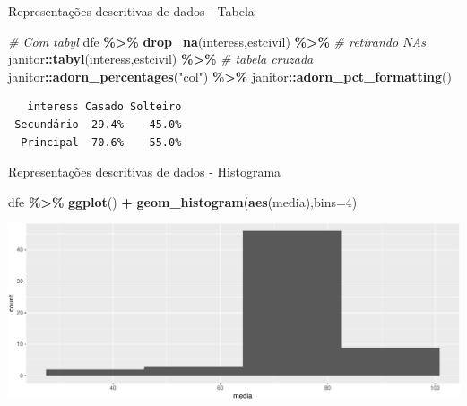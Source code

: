 \documentclass[
  9pt,
  ignorenonframetext,
  aspectratio=169]{beamer}
\newenvironment{Shaded}{\begin{snugshade}}{\end{snugshade}}
\newcommand{\CommentTok}[1]{\textcolor[rgb]{0.56,0.35,0.01}{\textit{#1}}}
\newcommand{\DataTypeTok}[1]{\textcolor[rgb]{0.13,0.29,0.53}{#1}}
\newcommand{\DecValTok}[1]{\textcolor[rgb]{0.00,0.00,0.81}{#1}}
\newcommand{\KeywordTok}[1]{\textcolor[rgb]{0.13,0.29,0.53}{\textbf{#1}}}
\newcommand{\NormalTok}[1]{#1}
\newcommand{\OperatorTok}[1]{\textcolor[rgb]{0.81,0.36,0.00}{\textbf{#1}}}
\newcommand{\StringTok}[1]{\textcolor[rgb]{0.31,0.60,0.02}{#1}}
\begin{document}
\begin{frame}[fragile]{Representações descritivas de dados - Tabela}
\protect\hypertarget{representauxe7uxf5es-descritivas-de-dados---tabela}{}
\begin{Shaded}
\begin{Highlighting}[]
\CommentTok{\# Com tabyl}
\NormalTok{dfe }\OperatorTok{\%\textgreater{}\%}
\StringTok{  }\KeywordTok{drop\_na}\NormalTok{(interess,estcivil) }\OperatorTok{\%\textgreater{}\%}\StringTok{ }\CommentTok{\# retirando NAs}
\StringTok{  }\NormalTok{janitor}\OperatorTok{::}\KeywordTok{tabyl}\NormalTok{(interess,estcivil) }\OperatorTok{\%\textgreater{}\%}\StringTok{ }\CommentTok{\# tabela cruzada}
\StringTok{  }\NormalTok{janitor}\OperatorTok{::}\KeywordTok{adorn\_percentages}\NormalTok{(}\StringTok{"col"}\NormalTok{) }\OperatorTok{\%\textgreater{}\%}
\StringTok{  }\NormalTok{janitor}\OperatorTok{::}\KeywordTok{adorn\_pct\_formatting}\NormalTok{()}
\end{Highlighting}
\end{Shaded}

\begin{verbatim}
   interess Casado Solteiro
 Secundário  29.4%    45.0%
  Principal  70.6%    55.0%
\end{verbatim}
\end{frame}

\begin{frame}[fragile]{Representações descritivas de dados - Histograma}
\protect\hypertarget{representauxe7uxf5es-descritivas-de-dados---histograma}{}
\begin{Shaded}
\begin{Highlighting}[]
\NormalTok{dfe }\OperatorTok{\%\textgreater{}\%}
\StringTok{  }\KeywordTok{ggplot}\NormalTok{() }\OperatorTok{+}
\StringTok{  }\KeywordTok{geom\_histogram}\NormalTok{(}\KeywordTok{aes}\NormalTok{(media),}\DataTypeTok{bins=}\DecValTok{4}\NormalTok{)}
\end{Highlighting}
\end{Shaded}

\includegraphics{aula_08_files/figure-beamer/unnamed-chunk-5-1.pdf}
\end{frame}
\end{document}
